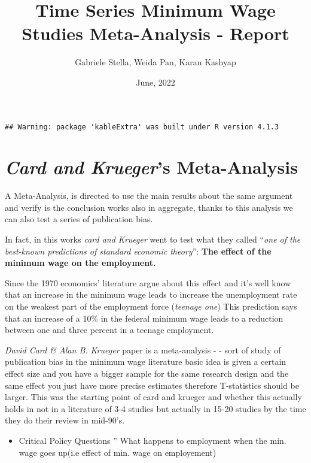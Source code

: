 \documentclass[
]{article}
\title{Time Series Minimum Wage Studies Meta-Analysis - Report}
\author{Gabriele Stella, Weida Pan, Karan Kashyap}
\date{June, 2022}
\providecommand{\tightlist}{%
  \setlength{\itemsep}{0pt}\setlength{\parskip}{0pt}}
\begin{document}
\maketitle

{
\setcounter{tocdepth}{2}
\tableofcontents
}
\begin{verbatim}
## Warning: package 'kableExtra' was built under R version 4.1.3
\end{verbatim}

\hypertarget{card-and-kruegers-meta-analysis}{%
\section{\texorpdfstring{\emph{Card and Krueger}'s
Meta-Analysis}{Card and Krueger's Meta-Analysis}}\label{card-and-kruegers-meta-analysis}}

A Meta-Analysis, is directed to use the main results about the same
argument and verify is the conclusion works also in aggregate, thanks to
this analysis we can also test a series of publication bias.

In fact, in this works \emph{card and Krueger} went to test what they
called ``\emph{one of the best-known predictions of standard economic
theory}'': \textbf{The effect of the minimum wage on the employment.}

Since the 1970 economics' literature argue about this effect and it's
well know that an increase in the minimum wage leads to increase the
unemployment rate on the weakest part of the employment force
(\emph{teenage one}) This prediction says that an increase of a 10\% in
the federal minimum wage leads to a reduction between one and three
percent in a teenage employment.

\emph{David Card \& Alan B. Krueger} paper is a meta-analysis - - sort
of study of publication bias in the minimum wage literature basic idea
is given a certain effect size and you have a bigger sample for the same
research design and the same effect you just have more precise estimates
therefore T-statistics should be larger. This was the starting point of
card and krueger and whether this actually holds in not in a literature
of 3-4 studies but actually in 15-20 studies by the time they do their
review in mid-90's.

\begin{itemize}
\tightlist
\item
  Critical Policy Questions '' What happens to employment when the min.
  wage goes up(i.e effect of min. wage on employement)
\end{itemize}
\end{document}
